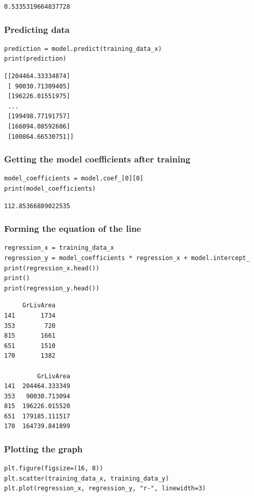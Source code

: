 \documentclass[11pt]{article}
\begin{document}
\label{org6f42202}
\begin{verbatim}
0.5335319664837728
\end{verbatim}
\subsubsection{Predicting data}
\label{sec:org42e1804}
\begin{verbatim}
prediction = model.predict(training_data_x)
print(prediction)
\end{verbatim}

\label{org5340281}
\begin{verbatim}
[[204464.33334874]
 [ 90030.71309405]
 [196226.01551975]
 ...
 [199498.77191757]
 [166094.08592606]
 [100864.66530751]]
\end{verbatim}
\subsubsection{Getting the model coefficients after training}
\label{sec:org7096fdc}
\begin{verbatim}
model_coefficients = model.coef_[0][0]
print(model_coefficients)
\end{verbatim}

\label{org623cd59}
\begin{verbatim}
112.85366889022535
\end{verbatim}
\subsubsection{Forming the equation of the line}
\label{sec:org56e7324}
\begin{verbatim}
regression_x = training_data_x
regression_y = model_coefficients * regression_x + model.intercept_
print(regression_x.head())
print()
print(regression_y.head())
\end{verbatim}

\label{org50f27b4}
\begin{verbatim}
     GrLivArea
141       1734
353        720
815       1661
651       1510
170       1382

         GrLivArea
141  204464.333349
353   90030.713094
815  196226.015520
651  179185.111517
170  164739.841899
\end{verbatim}

 \newpage
\subsubsection{Plotting the graph}
\label{sec:org7464f56}
\begin{verbatim}
plt.figure(figsize=(16, 8))
plt.scatter(training_data_x, training_data_y)
plt.plot(regression_x, regression_y, "r-", linewidth=3)
\end{verbatim}
\end{document}
